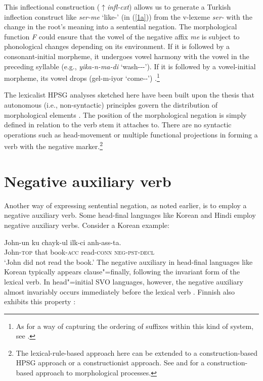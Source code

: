 \documentclass[output=paper
                ,modfonts
                		,nonflat
	        ,collection
	        ,collectionchapter
	        ,collectiontoclongg
 	        ,biblatex
                ,babelshorthands
                ,newtxmath
                ,draftmode
                ,colorlinks, citecolor=brown
]{./langsci/langscibook}
\begin{document}
{\begin{exe}
\begin{xlist}
\begin{exe}
\begin{xlist}
{This inflectional construction ($\uparrow$\textit{infl-cxt}) allows us to generate a Turkish inflection construct like \textit{ser-me} `like-\NEG' (in (\ref{1a})) from the v-lexeme \textit{ser-} with the change in the root's meaning into a sentential negation. The morphological function \textit{F} could ensure that the vowel of the negative affix \textit{me} is subject to phonological changes depending on its environment. If it is followed by a consonant-initial morpheme, it undergoes vowel harmony with the vowel in the preceding syllable (e.g., \textit{yika-n-ma-di} `wash-\REFL-\NEG-\PST'). If it is followed by a vowel-initial morpheme, its vowel drops (gel-m-iyor `come-\NEG-\PROG')  \citep[see]{kelepir}.\footnote{As
 for a way of capturing the ordering of suffixes within this kind of system,
 see \citet{Kim:16}.}
}\fi

The lexicalist HPSG analyses sketched here
 have been built upon the
thesis that autonomous (i.e., non-syntactic) principles govern the
distribution of morphological elements \citep{BM:95}.
The position of the morphological negation is simply
defined in relation to
the verb stem it attaches to. There are no syntactic operations such
as head-movement or multiple functional projections in forming
a verb with the negative marker.\footnote{The lexical-rule-based
approach here can be extended to a construction-based HPSG
approach or a constructionist approach. See
\citet{Sag:12} and \citet{Hilpert:16} for a construction-based
approach to morphological processes.}



\section{Negative auxiliary verb}

Another way of expressing sentential negation, as noted earlier, is to employ
a negative auxiliary
verb. Some head-final languages like Korean and Hindi employ
negative auxiliary verbs. Consider a Korean example:

\ea
\gll John-un ku chayk-ul ilk-ci anh-ass-ta. \\
     John-\textsc{top} that book-\textsc{acc} read-\textsc{conn} \textsc{neg}-\textsc{pst}-\textsc{decl}  \\
\glt `John did not read the book.'
\z
%
%
\noindent
The negative auxiliary in head-final languages like Korean
typically appears clause"=finally, following the invariant form of the lexical verb.
In head"=initial SVO languages, however, the negative auxiliary
almost invariably occurs immediately before the lexical verb
\citep{Payne:85}. Finnish also exhibits this property \citep{Mitchell:91}:


\end{xlist}
\end{exe}
\end{xlist}
\end{exe}}
\end{document}
